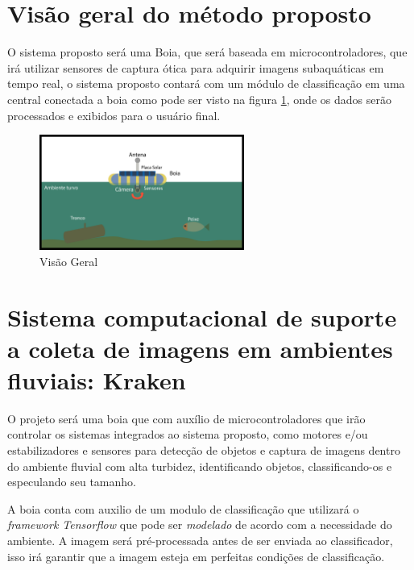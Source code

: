 \label{chapter:metodo}
\section{Visão geral do método proposto}
   
   O sistema proposto será uma Boia, que será baseada em microcontroladores, que irá utilizar sensores de captura ótica para adquirir imagens subaquáticas em tempo real, o sistema proposto contará com um módulo de classificação em uma central conectada a boia como pode ser visto na figura \ref{fig:bigpic}, onde os dados serão processados e exibidos para o usuário final. 
   

\begin{figure}[ht]
	\centering
    \caption{\label{fig:bigpic}Visão Geral}
	\includegraphics[width = 0.6\textwidth]{resources/bugpicturefloater}
\end{figure}

\section{Sistema computacional de suporte a coleta de imagens em ambientes fluviais: Kraken}

O projeto será uma boia que com auxílio de microcontroladores que irão controlar os sistemas integrados ao sistema proposto, como motores e/ou estabilizadores e sensores para detecção de objetos e captura de imagens dentro do ambiente fluvial com alta turbidez, identificando objetos, classificando-os e especulando seu tamanho.

A boia conta com auxilio de um modulo de classificação que utilizará o \textit{framework Tensorflow} que pode ser \textit{modelado} de acordo com a necessidade do ambiente. A imagem será pré-processada antes de ser enviada ao classificador, isso irá garantir que a imagem esteja em perfeitas condições de classificação.

